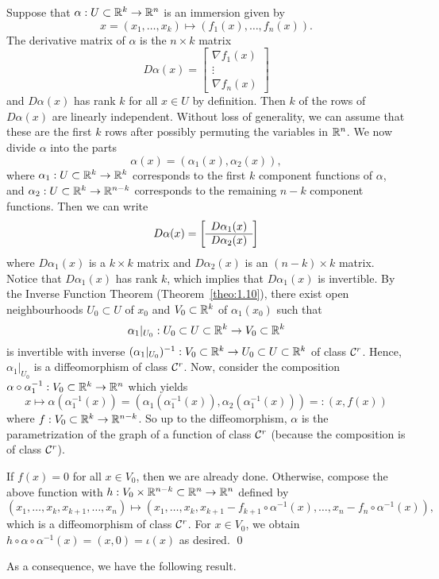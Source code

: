 \begin{pf}
    Suppose that $\alpha : U \subset \mathbb{R}^k \to \mathbb{R}^n$ is an immersion given by 
    \[ x = (x_1, \dots, x_k) \mapsto (f_1(x), \dots, f_n(x)). \] 
    The derivative matrix of $\alpha$ is the $n \times k$ matrix 
    \[ D\alpha(x) = \begin{bmatrix}
        \nabla f_1(x) \\ \vdots \\ \nabla f_n(x) 
    \end{bmatrix} \] 
    and $D\alpha(x)$ has rank $k$ for all $x \in U$ by definition. Then 
    $k$ of the rows of $D\alpha(x)$ are linearly independent. Without loss of 
    generality, we can assume that these are the first $k$ rows after possibly 
    permuting the variables in $\mathbb{R}^n$. We now divide $\alpha$ into 
    the parts 
    \[ \alpha(x) = (\alpha_1(x), \alpha_2(x)), \] 
    where $\alpha_1 : U \subset \mathbb{R}^k \to \mathbb{R}^k$ corresponds to the first 
    $k$ component functions of $\alpha$, and $\alpha_2 : U \subset \mathbb{R}^k \to \mathbb{R}^{n-k}$ 
    corresponds to the remaining $n-k$ component functions. Then we can write 
    \[ D\alpha(x) = \mleft[ \begin{array}{c} D\alpha_1(x) \\ \hline D\alpha_2(x) \end{array} \mright] \]
    where $D\alpha_1(x)$ is a $k \times k$ matrix and $D\alpha_2(x)$ is an 
    $(n-k) \times k$ matrix. Notice that $D\alpha_1(x)$ has rank $k$, which 
    implies that $D\alpha_1(x)$ is invertible. By the Inverse Function Theorem 
    (Theorem~\ref{theo:1.10}), there exist open neighbourhoods $U_0 \subset U$ 
    of $x_0$ and $V_0 \subset \mathbb{R}^k$ of $\alpha_1(x_0)$ such that 
    \[ \alpha_1|_{U_0} : U_0 \subset U \subset \mathbb{R}^k \to V_0 \subset \mathbb{R}^k \] 
    is invertible with inverse 
    $(\alpha_1|_{U_0})^{-1} : V_0 \subset \mathbb{R}^k \to U_0 \subset U \subset \mathbb{R}^k$ 
    of class ${\cal C}^r$. Hence, $\alpha_1|_{U_0}$ is a diffeomorphism of class ${\cal C}^r$. 
    Now, consider the composition $\alpha \circ \alpha_1^{-1} : 
    V_0 \subset \mathbb{R}^k \to \mathbb{R}^n$ which yields 
    \[ x \mapsto \alpha(\alpha_1^{-1}(x)) = (\alpha_1(\alpha_1^{-1}(x)), 
    \alpha_2(\alpha_1^{-1}(x))) =: (x, f(x)) \]  
    where $f : V_0 \subset \mathbb{R}^k \to \mathbb{R}^{n-k}$. So up to the diffeomorphism, 
    $\alpha$ is the parametrization of the graph of a function of class ${\cal C}^r$ 
    (because the composition is of class ${\cal C}^r$). 

    If $f(x) = 0$ for all $x \in V_0$, then we are already done. Otherwise, 
    compose the above function with $h : V_0 \times \mathbb{R}^{n-k} \subset \mathbb{R}^n 
    \to \mathbb{R}^n$ defined by 
    \[ (x_1, \dots, x_k, x_{k+1}, \dots, x_n) \mapsto 
    (x_1, \dots, x_k, x_{k+1} - f_{k+1} \circ \alpha^{-1}(x), \dots, 
    x_n - f_n \circ \alpha^{-1}(x)), \] 
    which is a diffeomorphism of class ${\cal C}^r$. For $x \in V_0$, we obtain 
    $h \circ \alpha \circ \alpha^{-1}(x) = (x, 0) = \iota(x)$ as desired. \qed 
\end{pf}\vspace{-0.25cm}
As a consequence, we have the following result. 

